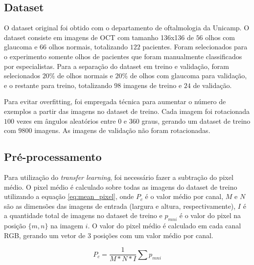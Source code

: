 \documentclass[conference]{IEEEtran}
\begin{document}
  \subsection{Dataset}


  O dataset original foi obtido com o departamento de oftalmologia da Unicamp. O dataset consiste em imagens de OCT com tamanho 136x136 de $56$ olhos com glaucoma e $66$ olhos normais, totalizando $122$ pacientes. Foram selecionados para o experimento somente olhos de pacientes que foram manualmente classificados por especialistas. Para a separação do dataset em treino e validação, foram selecionados $20\%$ de olhos normais e $20\%$ de olhos com glaucoma para validação, e o restante para treino, totalizando $98$ imagens de treino e $24$ de validação.

  Para evitar overfitting, foi empregada técnica para aumentar o número de exemplos a partir das imagens no dataset de treino. Cada imagem foi rotacionada $100$ vezes em ângulos aleatórios entre $0$ e $360$ graus, gerando um dataset de treino com $9800$ imagens. As imagens de validação não foram rotacionadas.

  \subsection{Pré-processamento}


  
  
  Para utilização do \textit{transfer learning}, foi necessário fazer a subtração do pixel médio. O pixel médio é calculado sobre todas as imagens do dataset de treino utilizando a equação \ref{eq:mean_pixel}, onde $P_c$ é o valor médio por canal, $M$ e $N$ são as dimensões das imagens de entrada (largura e altura, respectivamente), $I$ é a quantidade total de imagens no dataset de treino e $p_{mni}$ é o valor do pixel na posição $\{m,n\}$ na imagem $i$. O valor do pixel médio é calculado em cada canal RGB, gerando um vetor de 3 posições com um valor médio por canal.


  \begin{equation}
    P_c = \frac{1}{M * N * I} \sum p_{mni}
    \label{eq:mean_pixel}
  \end{equation}
\end{document}
